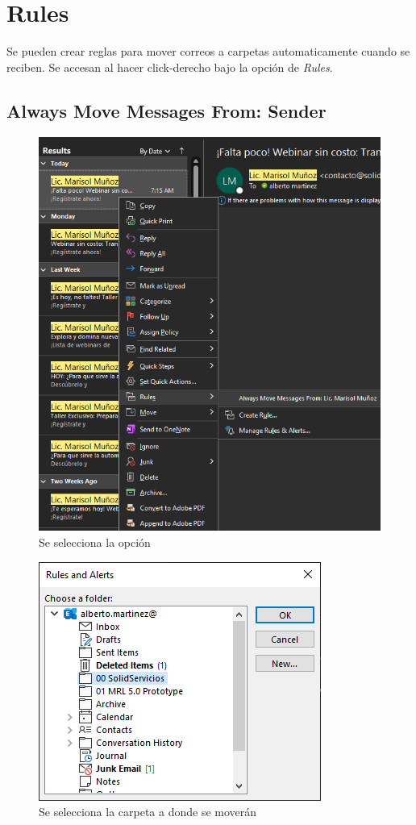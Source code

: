 \documentclass{report}
\begin{document}
\chapter{Rules}

Se pueden crear reglas para mover correos a carpetas automaticamente cuando se reciben. Se accesan al hacer click-derecho bajo la opción de \emph{Rules}.

\section{Always Move Messages From: Sender}

\begin{figure}[H]
	\centering
	\includegraphics[width=0.85\linewidth, height=0.45\textheight,keepaspectratio]{Imagenes/outlook_rules01}
	\caption{Se selecciona la opción}
	\label{fig:outlookrules01}
\end{figure}

\begin{figure}[H]
	\centering
	\includegraphics[width=0.75\linewidth, height=0.35\textheight,keepaspectratio]{Imagenes/outlook_rules02}
	\caption{Se selecciona la carpeta a donde se moverán}
	\label{fig:outlookrules02}
\end{figure}
\end{document}
